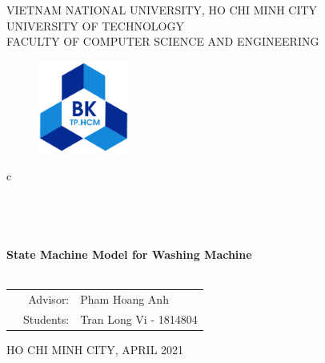\documentclass[13pt,a4paper]{article}
\begin{document}
	
	\begin{titlepage}
		\begin{center}
			VIETNAM NATIONAL UNIVERSITY, HO CHI MINH CITY \\
			UNIVERSITY OF TECHNOLOGY \\
			FACULTY OF COMPUTER SCIENCE AND ENGINEERING
		\end{center}
		
		\vspace{1cm}
		
		\begin{figure}[h!]
			\begin{center}
				\includegraphics[width=3cm]{hcmut.png}
			\end{center}
		\end{figure}
		
		\vspace{1cm}
		
		\begin{center}
			\color{blue}
			\begin{tabular}{c}
				\\
				~~\\
				\hline
				\\
				\\
				\\
				\textbf{{\huge State Machine Model for Washing Machine}}\\
				\\
				\hline
			\end{tabular}
			\color{blue}
		\end{center}
		\vspace{1cm}
		
		\begin{table}[h]
			\color{blue}
			\begin{tabular}{rrl}
				\hspace{5 cm} & Advisor: & Pham Hoang Anh\\
				& Students: & Tran Long Vi - 1814804 \\
			\end{tabular}
			\color{blue}
		\end{table}
		
		\vspace{4 cm}
		\begin{center}
			{\footnotesize\large HO CHI MINH CITY, APRIL 2021}
		\end{center}
	\end{titlepage}
	
\end{document}
